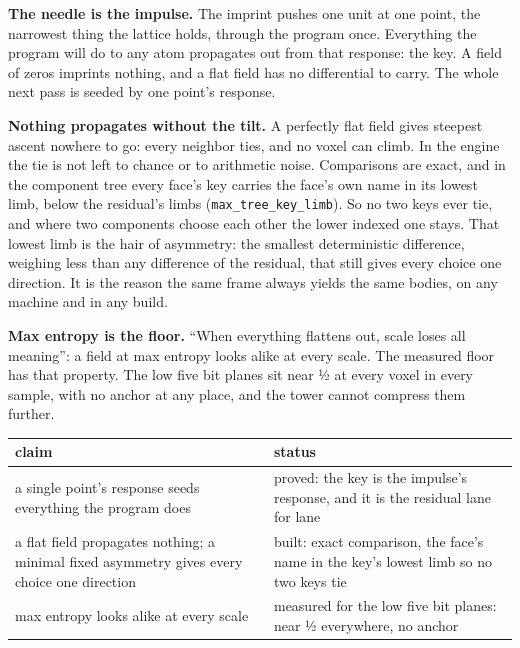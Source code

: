 \textbf{The needle is the impulse.} The imprint pushes one unit at one point, the narrowest thing the lattice holds, through the program once. Everything the program will do to any atom propagates out from that response: the key. A field of zeros imprints nothing, and a flat field has no differential to carry. The whole next pass is seeded by one point's response.

\textbf{Nothing propagates without the tilt.} A perfectly flat field gives steepest ascent nowhere to go: every neighbor ties, and no voxel can climb. In the engine the tie is not left to chance or to arithmetic noise. Comparisons are exact, and in the component tree every face's key carries the face's own name in its lowest limb, below the residual's limbs (\texttt{max\_\allowbreak{}tree\_\allowbreak{}key\_\allowbreak{}limb}). So no two keys ever tie, and where two components choose each other the lower indexed one stays. That lowest limb is the hair of asymmetry: the smallest deterministic difference, weighing less than any difference of the residual, that still gives every choice one direction. It is the reason the same frame always yields the same bodies, on any machine and in any build.

\textbf{Max entropy is the floor.} “When everything flattens out, scale loses all meaning”: a field at max entropy looks alike at every scale. The measured floor has that property. The low five bit planes sit near ½ at every voxel in every sample, with no anchor at any place, and the tower cannot compress them further.

{\small
\setlength{\tabcolsep}{6pt}
\begin{longtable}{>{\RaggedRight\arraybackslash}p{}>{\RaggedRight\arraybackslash}p{}}
\toprule
claim & status \\
\midrule
\endhead
a single point's response seeds everything the program does & proved: the key is the impulse's response, and it is the residual lane for lane \\
a flat field propagates nothing; a minimal fixed asymmetry gives every choice one direction & built: exact comparison, the face's name in the key's lowest limb so no two keys tie \\
max entropy looks alike at every scale & measured for the low five bit planes: near ½ everywhere, no anchor \\
\bottomrule
\end{longtable}
}

